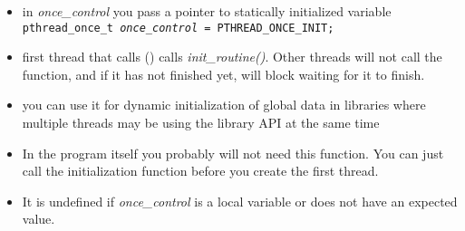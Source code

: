 

\begin{slide}
\begin{itemize}
\item in \emph{once\_control} you pass a pointer to statically initialized
variable \\ \texttt{pthread\_once\_t
\emph{once\_control} = PTHREAD\_ONCE\_INIT;}
\item first thread that calls () calls
\emph{init\_routine()}.  Other threads will not call the function, and if it has
not finished yet, will block waiting for it to finish.
\item you can use it for dynamic initialization of global data in libraries
where multiple threads may be using the library API at the same time
\end{itemize}
\end{slide}

\begin{itemize}
\item In the program itself you probably will not need this function.  You can
just call the initialization function before you create the first thread.
\item It is undefined if \emph{once\_control} is a local variable or does not
have an expected value.
\end{itemize}



